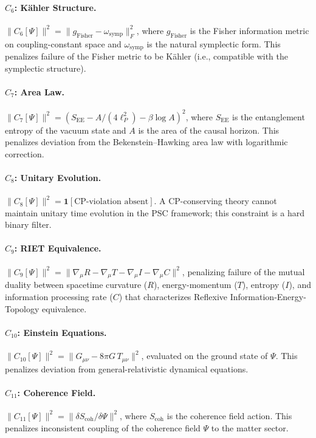\documentclass[11pt,twocolumn]{article}
\theoremstyle{remark}
\begin{document}
\paragraph{$C_6$: K\"{a}hler Structure.}
$\|C_6[\Psi]\|^2 = \|g_{\mathrm{Fisher}} - \omega_{\mathrm{symp}}\|^2_F$,
where $g_{\mathrm{Fisher}}$ is the Fisher information metric on
coupling-constant space and $\omega_{\mathrm{symp}}$ is the natural
symplectic form.
This penalizes failure of the Fisher metric to be K\"{a}hler (i.e.,
compatible with the symplectic structure).

\paragraph{$C_7$: Area Law.}
$\|C_7[\Psi]\|^2 = (S_{\mathrm{EE}} - A/(4\ell_P^2) -
\beta\log A)^2$,
where $S_{\mathrm{EE}}$ is the entanglement entropy of the
vacuum state and $A$ is the area of the causal horizon.
This penalizes deviation from the Bekenstein--Hawking area law
with logarithmic correction.

\paragraph{$C_8$: Unitary Evolution.}
$\|C_8[\Psi]\|^2 = \mathbf{1}[\text{CP-violation absent}]$.
A CP-conserving theory cannot maintain unitary time evolution in
the PSC framework; this constraint is a hard binary filter.

\paragraph{$C_9$: RIET Equivalence.}
$\|C_9[\Psi]\|^2 = \|\nabla_\mu R - \nabla_\mu T - \nabla_\mu I -
\nabla_\mu C\|^2$,
penalizing failure of the mutual duality between spacetime curvature
($R$), energy-momentum ($T$), entropy ($I$), and information
processing rate ($C$) that characterizes Reflexive Information-Energy-Topology
equivalence.

\paragraph{$C_{10}$: Einstein Equations.}
$\|C_{10}[\Psi]\|^2 = \|G_{\mu\nu} - 8\pi G\,T_{\mu\nu}\|^2$,
evaluated on the ground state of $\Psi$.
This penalizes deviation from general-relativistic dynamical
equations.

\paragraph{$C_{11}$: Coherence Field.}
$\|C_{11}[\Psi]\|^2 = \|\delta S_{\mathrm{coh}}/\delta\Psi\|^2$,
where $S_{\mathrm{coh}}$ is the coherence field action.
This penalizes inconsistent coupling of the coherence field
$\Psi$ to the matter sector.
\end{document}
